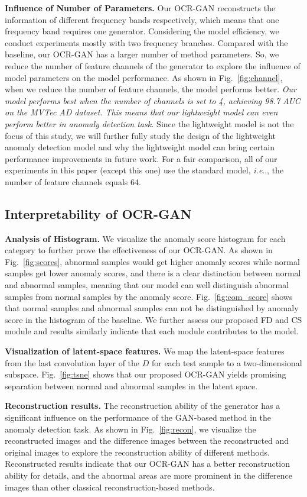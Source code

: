 \documentclass[lettersize,journal]{IEEEtran}
\makeatletter
\DeclareRobustCommand\onedot{\futurelet\@let@token\@onedot}
\def\@onedot{\ifx\@let@token.\else.\null\fi\xspace}
\def\ie{\emph{i.e}\onedot} \def\Ie{\emph{I.e}\onedot}
\makeatother
\begin{document}
\noindent\textbf{Influence of Number of Parameters.} Our OCR-GAN reconstructs the information of different frequency bands respectively, which means that one frequency band requires one generator. Considering the model efficiency, we conduct experiments mostly with two frequency branches. Compared with the baseline, our OCR-GAN has a larger number of method parameters. So, we reduce the number of feature channels of the generator to explore the influence of model parameters on the model performance. As shown in Fig.~\ref{fig:channel}, when we reduce the number of feature channels, the model performs better. \emph{Our model performs best when the number of channels is set to 4, achieving 98.7 AUC on the MVTec AD dataset. This means that our lightweight model can even perform better in anomaly detection task.} Since the lightweight model is not the focus of this study, we will further fully study the design of the lightweight anomaly detection model and why the lightweight model can bring certain performance improvements in future work. For a fair comparison, all of our experiments in this paper (except this one) use the standard model, \ie, the number of feature channels equals 64. 

\subsection{Interpretability of OCR-GAN}
\noindent\textbf{Analysis of Histogram.}
We visualize the anomaly score histogram for each category to further prove the effectiveness of our OCR-GAN. As shown in Fig.~\ref{fig:scores}, abnormal samples would get higher anomaly scores while normal samples get lower anomaly scores, and there is a clear distinction between normal and abnormal samples, meaning that our model can well distinguish abnormal samples from normal samples by the anomaly score. Fig.~\ref{fig:com_score} shows that normal samples and abnormal samples can not be distinguished by anomaly score in the histogram of the baseline. We further assess our proposed FD and CS module and results similarly indicate that each module contributes to the model.

\noindent\textbf{Visualization of latent-space features. }
We map the latent-space features from the last convolution layer of the $D$ for each test sample to a two-dimensional subspace. Fig.~\ref{fig:tsne} shows that our proposed OCR-GAN yields promising separation between normal and abnormal samples in the latent space.

\noindent\textbf{Reconstruction results. }
The reconstruction ability of the generator has a significant influence on the performance of the GAN-based method in the anomaly detection task. As shown in Fig.~\ref{fig:recon}, we visualize the reconstructed images and the difference images between the reconstructed and original images to explore the reconstruction ability of different methods. Reconstructed results indicate that our OCR-GAN has a better reconstruction ability for details, and the abnormal areas are more prominent in the difference images than other classical reconstruction-based methods.
\end{document}
